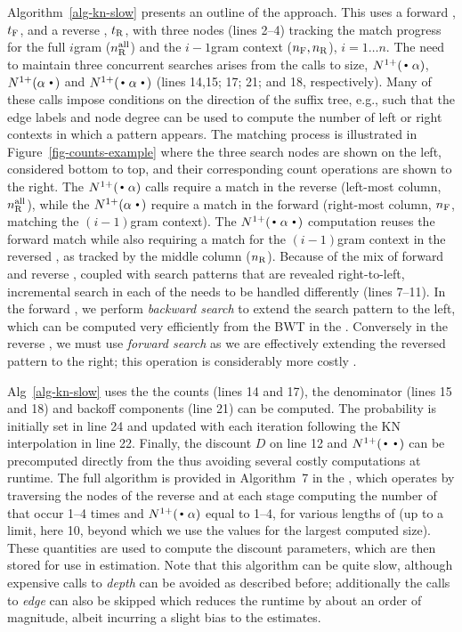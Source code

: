 Algorithm~\ref{alg-kn-slow} presents an outline of the approach.
This uses a forward \CST, $t_{\text{F}}$, and a reverse \CST, $t_{\text{R}}$, with three \CST nodes (lines 2--4) tracking the match progress for the full $i$gram ($n_{\text{R}}^{\text{all}}$) and the $i-1$gram context ($n_{\text{F}}, n_{\text{R}}$), $i=1 \ldots n$.
The need to maintain three concurrent searches arises from the calls to size, $\nlplus{\dotpat}$, $\nlplus{\patdot}$ and $\nlplus{\dotpatdot}$ (lines 14,15; 17; 21; and 18, respectively).
Many of these calls impose conditions on the direction of the suffix tree, e.g., such that the edge 
labels and node degree can be used to compute the number of left or right contexts in which a pattern appears. 
The matching process is illustrated in Figure~\ref{fig-counts-example} where the three search nodes are shown on the left, considered bottom to top, and their corresponding count operations are shown to the right.
The $\nlplus{\dotpat}$ calls require a match in the reverse \CST (left-most column, $n_{\text{R}}^{\text{all}}$), while the $\nlplus{\patdot}$ require a match in the forward \CST (right-most column, $n_{\text{F}}$, matching the $(i-1)$gram context). 
The $\nlplus{\dotpatdot}$ computation reuses the forward match while also requiring a match for the $(i-1)$gram context in the reversed \CST, as tracked by the middle column ($n_{\text{R}}$).
Because of the mix of forward and reverse \CSTs, coupled with search patterns that are revealed right-to-left, incremental search in each of the \CSTs needs to be handled differently (lines 7--11).
In the forward \CST, we perform \emph{backward search} to extend the search pattern to the left, which can be computed very efficiently from the BWT in the \CSA {}.
Conversely in the reverse \CST, we must use \emph{forward search} as we are effectively extending the reversed pattern to the right; this operation is considerably more costly .

Alg~\ref{alg-kn-slow} uses the  the counts (lines 14 and 17), the denominator (lines 15 and 18) and backoff components (line 21) can be computed.
The probability is initially set in line 24 and updated with each iteration following the KN interpolation in line 22.
Finally, the discount $D$ on line 12 and $\nlplus{\Bigcdot\Bigcdot}$ can be precomputed directly from the \CSTs  thus avoiding several costly computations at runtime. 
The full algorithm is provided in Algorithm~7 in the \supp, which operates by traversing the nodes of the reverse \CST and at each stage computing the number of \ngrams that occur 1--4 times and $\nlplus{\dotpat}$ equal to 1--4, for various lengths of \ngrams (up to a limit, here 10, beyond which we use the values for the largest computed size).
These quantities are used to compute the discount parameters, which are then stored for use in estimation.
Note that this algorithm can be quite slow, although expensive calls to \emph{depth} can be avoided as described before; additionally the calls to \emph{edge} can also be skipped which reduces the runtime by about an order of magnitude, albeit incurring a slight bias to the estimates. 

